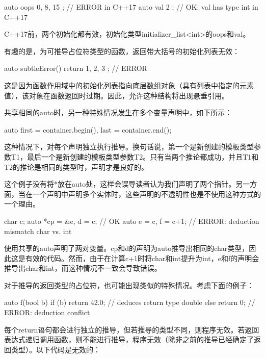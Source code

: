 \begin{cpp}
auto oops { 0, 8, 15 }; // ERROR in C++17
auto val { 2 }; // OK: val has type int in C++17
\end{cpp}

C++17前，两个初始化都有效，初始化类型initializer\_list<int>的oops和val。

有趣的是，为可推导占位符类型的函数，返回带大括号的初始化列表无效：

\begin{cpp}
auto subtleError() {
	return { 1, 2, 3 }; // ERROR
}
\end{cpp}

这是因为函数作用域中的初始化列表指向底层数组对象（具有列表中指定的元素值），该对象在函数返回时过期。因此，允许这种结构将出现悬垂引用。

共享相同的auto时，另一种特殊情况发生在多个变量声明中，如下所示：

\begin{cpp}
auto first = container.begin(), last = container.end();
\end{cpp}

这种情况下，对每个声明独立执行推导。换句话说，第一个是新创建的模板类型参数T1，最后一个是新创建的模板类型参数T2。只有当两个推论都成功，并且T1和T2的推论是相同的类型时，声明才是良好的。

\begin{notice}
这个例子没有将*放在auto处，这样会误导读者认为我们声明了两个指针。另一方面，当在一个声明中声明多个实体时，这些声明的不透明性也是不使用这种方式的一个理由。
\end{notice}

\begin{cpp}
char c;
auto *cp = &c, d = c; // OK
auto e = c, f = c+1; // ERROR: deduction mismatch char vs. int
\end{cpp}

使用共享的auto声明了两对变量。cp和d的声明为auto推导出相同的char类型，因此这是有效的代码。然而，由于在计算c+1时将char和int提升为int，e和f的声明会推导出char和int，而这种情况不一致会导致错误。

对于推导的返回类型的占位符，也可能出现类似的特殊情况。考虑下面的例子：

\begin{cpp}
auto f(bool b) {
	if (b) {
		return 42.0; // deduces return type double
	} else {
		return 0; // ERROR: deduction conflict
	}
}
\end{cpp}

每个return语句都会进行独立的推导，但若推导的类型不同，则程序无效。若返回表达式递归调用函数，则不能进行推导，程序无效（除非之前的推导已经确定了返回类型）。以下代码是无效的：

